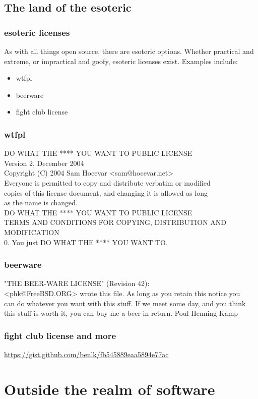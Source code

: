 \documentclass{beamer}
\begin{document}
	\subsection{The land of the esoteric}
	\begin{frame}
		\frametitle{esoteric licenses}
		As with all things open source, there are esoteric options. Whether practical and extreme, or impractical and goofy, esoteric licenses exist. Examples include:
		\pause
		\begin{itemize}[<+->]
			\item wtfpl
			\item beerware
			\item fight club license
		\end{itemize}
	\end{frame}
	\begin{frame}
		\frametitle{wtfpl}
		DO WHAT THE **** YOU WANT TO PUBLIC LICENSE\\
		Version 2, December 2004\\
		Copyright (C) 2004 Sam Hocevar <sam@hocevar.net>\\
		Everyone is permitted to copy and distribute verbatim or modified\\
		copies of this license document, and changing it is allowed as long\\
		as the name is changed.\\
		DO WHAT THE **** YOU WANT TO PUBLIC LICENSE\\
		TERMS AND CONDITIONS FOR COPYING, DISTRIBUTION AND MODIFICATION\\
		0. You just DO WHAT THE **** YOU WANT TO.\\
	\end{frame}
	\begin{frame}
		\frametitle{beerware}
		"THE BEER-WARE LICENSE" (Revision 42):\\
		<phk@FreeBSD.ORG> wrote this file. As long as you retain this notice you\\
		can do whatever you want with this stuff. If we meet some day, and you think\\
		this stuff is worth it, you can buy me a beer in return.   Poul-Henning Kamp\\
	\end{frame}
	\begin{frame}
		\frametitle{fight club license and more}
		\center\url{https://gist.github.com/benlk/fb545889eaa5894e77ac}
	\end{frame}
	\section{Outside the realm of software}
\end{document}
